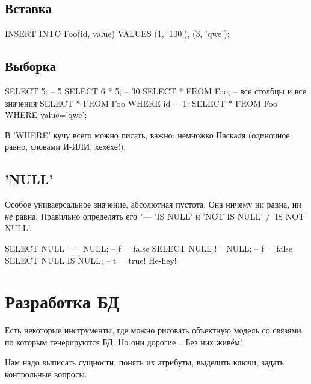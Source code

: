 \subsection{Вставка}

\begin{sqlcode}
INSERT INTO Foo(id, value) VALUES (1, '100'), (3, 'qwe');
\end{sqlcode}

\subsection{Выборка}

\begin{sqlcode}
SELECT 5; -- 5
SELECT 6 * 5; -- 30
SELECT * FROM Foo; -- все столбцы и все значения
SELECT * FROM Foo WHERE id = 1;
SELECT * FROM Foo WHERE value='qwe';
\end{sqlcode}
В \sql'WHERE' кучу всего можно писать, важно: немножко Паскаля (одиночное равно, словами И-ИЛИ, хехехе!).

\subsection{\texorpdfstring{\sql'NULL'}{NULL}}

Особое униваерсальное значение, абсолютная пустота.
Она ничему ни равна, ни \textit{не} равна.
Правильно определять его "--- \sql'IS NULL' и \sql'NOT IS NULL' / \sql'IS NOT NULL'.

\begin{sqlcode}
SELECT NULL == NULL; -- f = false
SELECT NULL != NULL; -- f = false
SELECT NULL IS NULL; -- t = true! He-hey!
\end{sqlcode}

\section{Разработка БД}

Есть некоторые инструменты, где можно рисовать объектную модель со связями, по которым генерируются БД.
Но они дорогие... Без них живём!

Нам надо выписать сущности, понять их атрибуты, выделить ключи, задать контрольные вопросы.


